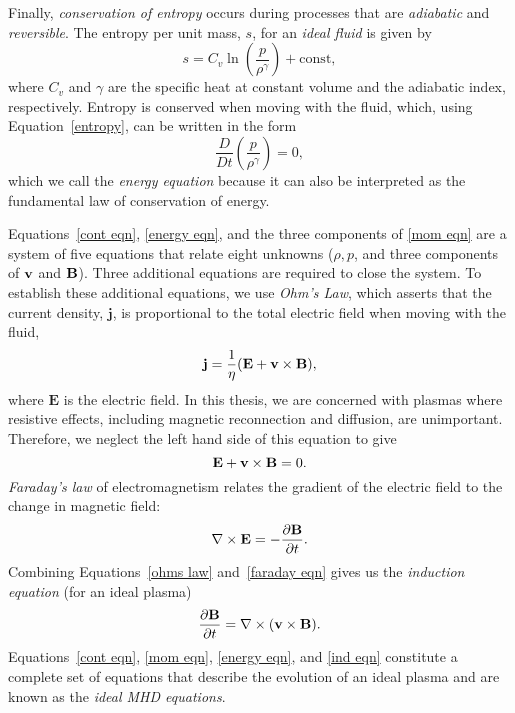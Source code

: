 Finally, \textit{conservation of entropy} occurs during processes that are \textit{adiabatic} and \textit{reversible}. The entropy per unit mass, $s$, for an \textit{ideal fluid} is given by
\begin{equation}
	s = C_v\ln\left(\frac{p}{\rho^\gamma}\right) + \text{const}, \label{entropy}
\end{equation}
where $C_v$ and $\gamma$ are the specific heat at constant volume and the adiabatic index, respectively. Entropy is conserved when moving with the fluid, which, using Equation~\eqref{entropy}, can be written in the form
\begin{equation}
\frac{D}{Dt}\left(\frac{p}{\rho^\gamma}\right) = 0, \label{energy eqn}
\end{equation}
which we call the \textit{energy equation} because it can also be interpreted as the fundamental law of conservation of energy.

Equations~\eqref{cont eqn}, \eqref{energy eqn}, and the three components of \eqref{mom eqn} are a system of five equations that relate eight unknowns ($\rho, p$, and three components of $\mathbf{v}$ and $\mathbf{B}$). Three additional equations are required to close the system. To establish these additional equations, we use \textit{Ohm's Law}, which asserts that the current density, $\mathbf{j}$, is proportional to the total electric field when moving with the fluid,
\begin{equation}
	\mathbf{j} = \frac{1}{\eta}(\mathbf{E} + \mathbf{v}\times\mathbf{B}),
\end{equation}
where $\mathbf{E}$ is the electric field. In this thesis, we are concerned with plasmas where resistive effects, including magnetic reconnection and diffusion, are unimportant. Therefore, we neglect the left hand side of this equation to give
\begin{equation}
\mathbf{E} + \mathbf{v}\times\mathbf{B} = 0. \label{ohms law}
\end{equation}
\textit{Faraday's law} of electromagnetism relates the gradient of the electric field to the change in magnetic field:
\begin{equation}
	\nabla\times\mathbf{E} = -\frac{\partial\mathbf{B}}{\partial t}. \label{faraday eqn}
\end{equation}
Combining Equations~\eqref{ohms law} and~\eqref{faraday eqn} gives us the \textit{induction equation} (for an ideal plasma)
\begin{equation}
	\frac{\partial\mathbf{B}}{\partial t} = \nabla\times(\mathbf{v}\times\mathbf{B}). \label{ind eqn}
\end{equation}
Equations~\eqref{cont eqn}, \eqref{mom eqn}, \eqref{energy eqn}, and \eqref{ind eqn} constitute a complete set of equations that describe the evolution of an ideal plasma and are known as the \textit{ideal MHD equations}.

